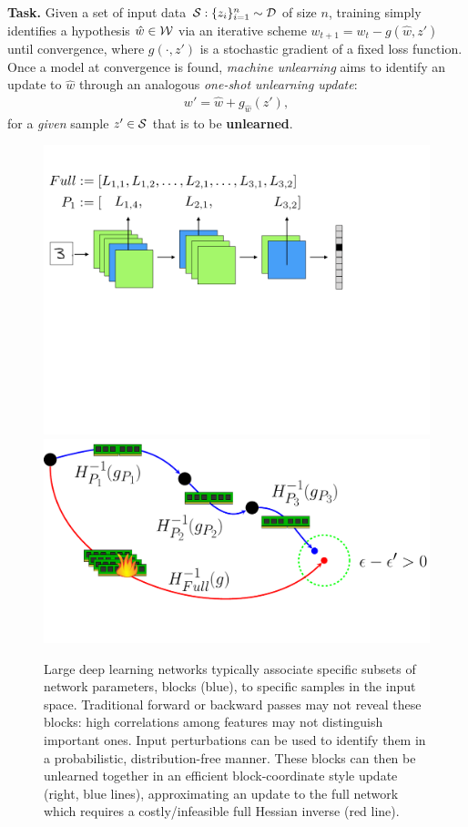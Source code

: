 \textbf{Task.} Given a set of input data $\mathcal{S}: \{z_i\}_{i=1}^n \sim \mathcal{D}$ of size $n$, training simply identifies a hypothesis $\hat{w} \in \mathcal{W}$  via an iterative scheme $w_{t+1} = w_t - g(\hat{w},z')$ until convergence, where $g(\cdot,z')$ is  a stochastic gradient of a fixed loss function. Once a model at convergence is found, \textit{machine unlearning} aims to identify an update to $\hat{w}$ through an analogous \textit{one-shot unlearning update}:
\begin{align}\label{eq:unlearn}
    w' = \hat{w} + g_{\hat{w}}\left(z'\right),
\end{align}
for a \textit{given} sample $z' \in \mathcal{S}$ that is to be \textbf{unlearned}.

\begin{figure}
	\centering
	\includegraphics[width=0.48\columnwidth,trim={0cm 12cm 5cm 2.5cm},clip]{chap4/layercnn.png}
	\includegraphics[width=0.48\columnwidth,trim={0cm 1cm 0cm 0cm},clip]{chap4/unlearning_fig.pdf}
	\caption{\label{fig:main}Large deep learning networks typically associate specific subsets of network parameters, blocks (blue), to specific samples in the input space.
		Traditional forward or backward passes may not reveal these blocks: high correlations among features may not distinguish important ones. Input perturbations can be used to identify them in a probabilistic, distribution-free manner. These blocks can then be unlearned together in an efficient block-coordinate style update (right, blue lines), approximating an update to the full network which requires a costly/infeasible full Hessian inverse (red line).}
\end{figure}

